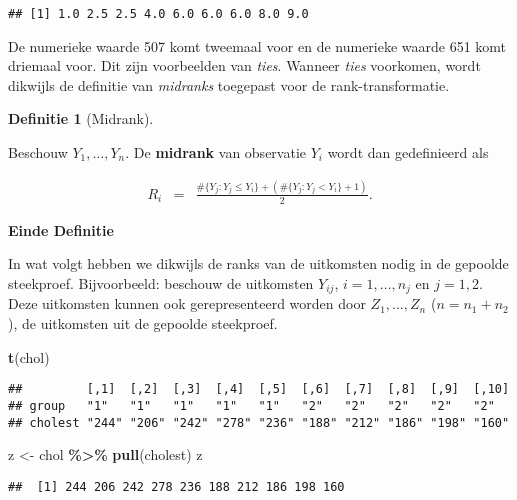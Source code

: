 \documentclass[
  12pt,dutch,coursenotes]{book}
\newenvironment{Shaded}{\begin{snugshade}}{\end{snugshade}}
\newcommand{\KeywordTok}[1]{\textcolor[rgb]{0.13,0.29,0.53}{\textbf{#1}}}
\newcommand{\NormalTok}[1]{#1}
\newcommand{\OperatorTok}[1]{\textcolor[rgb]{0.81,0.36,0.00}{\textbf{#1}}}
\newcommand{\StringTok}[1]{\textcolor[rgb]{0.31,0.60,0.02}{#1}}
\theoremstyle{definition}
\newtheorem{definition}{Definitie}[chapter]
\theoremstyle{definition}
\theoremstyle{definition}
\theoremstyle{remark}
\begin{document}
\begin{verbatim}
## [1] 1.0 2.5 2.5 4.0 6.0 6.0 6.0 8.0 9.0
\end{verbatim}

De numerieke waarde 507 komt tweemaal voor en de numerieke waarde 651 komt driemaal voor. Dit zijn voorbeelden van \emph{ties}.
Wanneer \emph{ties} voorkomen, wordt dikwijls de definitie van \emph{midranks} toegepast voor de rank-transformatie.

\begin{definition}[Midrank]
\protect\hypertarget{def:unnamed-chunk-210}{}{\label{def:unnamed-chunk-210} \iffalse (Midrank) \fi{} }
\end{definition}
Beschouw \(Y_1, \ldots, Y_n\).
De \textbf{midrank} van observatie \(Y_i\) wordt dan
gedefinieerd als

\begin{eqnarray*}
   R_i &=& \frac{ \#\{Y_j: Y_j\leq Y_i\} + ( \#\{Y_j: Y_j < Y_i\} +1)}{2}.
  \end{eqnarray*}

\textbf{Einde Definitie}

In wat volgt hebben we dikwijls de ranks van de uitkomsten nodig in de gepoolde steekproef. Bijvoorbeeld: beschouw de uitkomsten \(Y_{ij}\), \(i=1,\ldots, n_j\) en \(j=1,2\).
Deze uitkomsten kunnen ook gerepresenteerd worden door \(Z_1,\ldots, Z_n\) (\(n=n_1+n_2\)), de uitkomsten uit de gepoolde steekproef.

\begin{Shaded}
\begin{Highlighting}[]
\KeywordTok{t}\NormalTok{(chol)}
\end{Highlighting}
\end{Shaded}

\begin{verbatim}
##         [,1]  [,2]  [,3]  [,4]  [,5]  [,6]  [,7]  [,8]  [,9]  [,10]
## group   "1"   "1"   "1"   "1"   "1"   "2"   "2"   "2"   "2"   "2"  
## cholest "244" "206" "242" "278" "236" "188" "212" "186" "198" "160"
\end{verbatim}

\begin{Shaded}
\begin{Highlighting}[]
\NormalTok{z \textless{}{-}}\StringTok{ }\NormalTok{chol }\OperatorTok{\%\textgreater{}\%}\StringTok{ }\KeywordTok{pull}\NormalTok{(cholest)}
\NormalTok{z}
\end{Highlighting}
\end{Shaded}

\begin{verbatim}
##  [1] 244 206 242 278 236 188 212 186 198 160
\end{verbatim}
\end{document}
